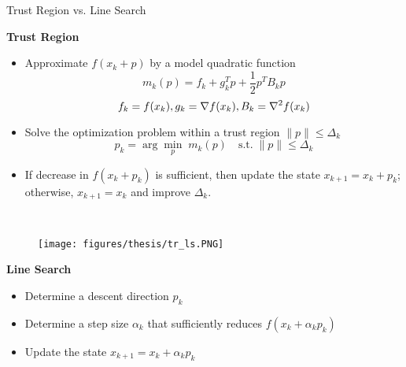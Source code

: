 \documentclass[usenames,dvipsnames]{beamer}
\begin{document}
\begin{frame}{Trust Region vs. Line Search}
	
	
	\begin{minipage}{0.6\textwidth}
		\textbf{Trust Region}
		
		\small
		
		\begin{itemize}
			\item Approximate $f(x_k + p)$ by a model quadratic function 
			$$m_k(p) = f_k + g_k^T p + \frac{1}{2}p^T B_k p$$
			$${\small f_k = f(x_k), g_k = \nabla f(x_k), B_k = \nabla^2 f(x_k)}$$
			\item Solve  the optimization problem within a trust region  $\|p\|\leq \Delta_k$
			\begin{equation*}
				p_k = \arg\min_{p} \; m_k(p) \quad	\text{s.t.} \; \|p\| \leq \Delta_k 
			\end{equation*}
			\vspace{-0.5cm}
			\item If decrease in $f(x_k + p_k)$ is sufficient, then update the state $x_{k+1} = x_k +  p_k$; otherwise, $x_{k+1} = x_k$ and improve $\Delta_k$.
		\end{itemize}
		
	\end{minipage}~
	\begin{minipage}{0.4\textwidth}
		\begin{figure}
			\centering
			\texttt{[image: figures/thesis/tr\_ls.PNG]}
		\end{figure}
		
		\textbf{Line Search}
		
		\small
		\begin{itemize}
			\item Determine a descent direction $p_k$
			\item Determine a step size $\alpha_k$ that sufficiently reduces $f(x_k + \alpha_k p_k)$
			\item Update the state $x_{k+1} = x_k + \alpha_k p_k$
		\end{itemize}
	\end{minipage}
	
	
	
	
\end{frame}
\end{document}
